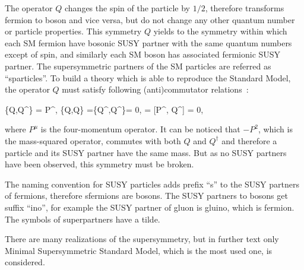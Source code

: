 The operator $Q$ changes the spin of the particle by $1/2$, therefore transforms fermion to boson and vice versa, but do not change any other quantum number or particle properties. This symmetry $Q$ yields to the symmetry within which each SM fermion have bosonic SUSY partner with the same quantum numbers except of spin, and similarly each SM boson has associated fermionic SUSY partner. The supersymmetric partners of the SM particles are referred as ``sparticles''. To build a theory which is able to reproduce the Standard Model, the operator $Q$ must satisfy following (anti)commutator relations~\cite{Haag:1974qh, Coleman:1967ad}:

{
\{Q,Q^{\dagger}\} = P^{\mu}, \; \{Q,Q\} =\{Q^{\dagger},Q^{\dagger}\}= 0, \; [P^{\mu}, Q] = [P^{\mu}, Q^{\dagger}] = 0,
}

where $P^{\mu}$ is the four-momentum operator. It can be noticed that $-P^{2}$, which is the mass-squared operator, commutes with both $Q$ and $Q^{\dagger}$ and therefore a particle and its SUSY partner have the same mass. But as no SUSY partners have been observed, this symmetry must be broken. 

The naming convention for SUSY particles adds prefix ``s'' to the SUSY partners of fermions, therefore sfermions are bosons. The SUSY partners to bosons get suffix ``ino'', for example the SUSY partner of gluon is gluino, which is fermion. The symbols of superpartners have a tilde.

There are many realizations of the supersymmetry, but in further text only Minimal Supersymmetric Standard Model, which is the most used one, is considered.


